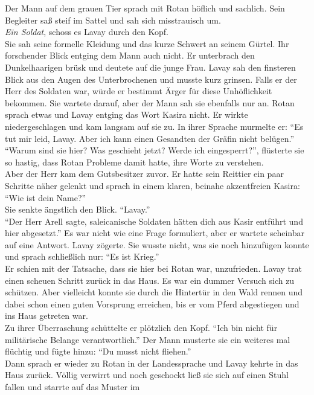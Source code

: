 Der Mann auf dem grauen Tier sprach mit Rotan höflich und sachlich. Sein Begleiter saß steif im 
Sattel und sah sich misstrauisch um.\\
\textit{Ein Soldat}, schoss es Lavay durch den Kopf.\\
Sie sah seine formelle Kleidung und das kurze Schwert an seinem Gürtel. Ihr forschender Blick 
entging dem Mann auch nicht. Er unterbrach den Dunkelhaarigen brüsk und deutete auf die junge 
Frau. Lavay sah den finsteren Blick aus den Augen des Unterbrochenen und musste kurz grinsen. Falls 
er der Herr des Soldaten war, würde er bestimmt Ärger für diese Unhöflichkeit bekommen. Sie wartete 
darauf, aber der Mann sah sie ebenfalls nur an. Rotan sprach etwas und Lavay entging das Wort 
Kasira nicht. Er wirkte niedergeschlagen und kam langsam auf sie zu. In ihrer Sprache murmelte er: 
``Es tut mir leid, Lavay. Aber ich kann einen Gesandten der Gräfin nicht belügen.''\\
``Warum sind sie hier? Was geschieht jetzt? Werde ich eingesperrt?'', flüsterte sie so hastig, dass 
Rotan Probleme damit hatte, ihre Worte zu verstehen.\\
Aber der Herr kam dem Gutsbesitzer zuvor. Er hatte sein Reittier ein paar Schritte näher gelenkt 
und sprach in einem klaren, beinahe akzentfreien Kasira: ``Wie ist dein Name?''\\
Sie senkte ängstlich den Blick. ``Lavay.''\\
``Der Herr Arell sagte, saleicanische Soldaten hätten dich aus Kasir entführt und hier abgesetzt.''
Es war nicht wie eine Frage formuliert, aber er wartete scheinbar auf eine Antwort. Lavay zögerte. 
Sie wusste nicht, was sie noch hinzufügen konnte und sprach schließlich nur: ``Es ist Krieg.''\\
Er schien mit der Tatsache, dass sie hier bei Rotan war, unzufrieden. Lavay trat einen scheuen 
Schritt zurück in das Haus. Es war ein dummer Versuch sich zu schützen. Aber vielleicht konnte sie 
durch die Hintertür in den Wald rennen und dabei schon einen guten Vorsprung erreichen, bis er vom 
Pferd abgestiegen und ins Haus getreten war.\\
Zu ihrer Überraschung schüttelte er plötzlich den Kopf. ``Ich bin nicht für militärische Belange 
verantwortlich.'' Der Mann musterte sie ein weiteres mal flüchtig und fügte hinzu: ``Du musst nicht 
fliehen.''\\
Dann sprach er wieder zu Rotan in der Landessprache und Lavay kehrte in das Haus zurück. Völlig 
verwirrt und noch geschockt ließ sie sich auf einen Stuhl fallen und starrte auf das Muster im 

